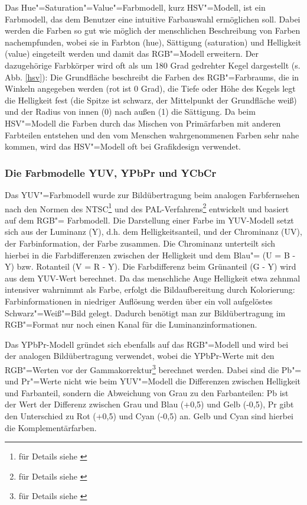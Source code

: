 \documentclass[a4paper,12pt,abstracton,titlepage]{scrartcl}
\begin{document}
Das Hue"=Saturation"=Value"=Farbmodell, kurz HSV"=Modell, ist ein Farbmodell, das dem Benutzer eine intuitive Farbauswahl ermöglichen soll. Dabei werden die Farben so gut wie möglich der  menschlichen Beschreibung von Farben nachempfunden, wobei sie in Farbton (hue), Sättigung (saturation) und Helligkeit (value) eingeteilt werden und damit das RGB"=Modell erweitern. Der dazugehörige Farbkörper wird oft als um 180 Grad gedrehter Kegel dargestellt (s. Abb. \ref{hsv}): Die Grundfläche beschreibt die Farben des RGB"=Farbraums, die in Winkeln angegeben werden (rot ist 0 Grad), die Tiefe oder Höhe des Kegels legt die Helligkeit fest (die Spitze ist schwarz, der Mittelpunkt der Grundfläche weiß) und der Radius von innen (0) nach außen (1) die Sättigung.
Da beim HSV"=Modell die Farben durch das Mischen von Primärfarben mit anderen Farbteilen entstehen und den vom Menschen wahrgenommenen Farben sehr nahe kommen, wird das HSV"=Modell oft bei Grafikdesign verwendet.

\vspace{1em}
\subsubsection{Die Farbmodelle YUV, YPbPr und YCbCr}
Das YUV"=Farbmodell wurde zur Bildübertragung beim analogen Farbfernsehen nach den Normen des NTSC\footnote{für Details siehe \cite{linkfangNTSC}} und des PAL-Verfahrens\footnote{für Details siehe \cite{linkfangPAL}} entwickelt und basiert auf dem RGB"= Farbmodell. Die Darstellung einer Farbe im YUV-Modell setzt sich aus der Luminanz (Y), d.h. dem Helligkeitsanteil, und der Chrominanz (UV), der Farbinformation, der Farbe zusammen. Die Chrominanz unterteilt sich hierbei in die Farbdifferenzen zwischen der Helligkeit und dem Blau"= (U = B - Y) bzw. Rotanteil (V = R - Y). Die Farbdifferenz beim Grünanteil (G - Y) wird aus dem YUV-Wert berechnet. Da das menschliche Auge Helligkeit etwa zehnmal intensiver wahrnimmt als Farbe, erfolgt die Bildaufbereitung durch Kolorierung: Farbinformationen in niedriger Auflösung werden über ein voll aufgelöstes Schwarz"=Weiß"=Bild gelegt. Dadurch benötigt man zur Bildübertragung im RGB"=Format nur noch einen Kanal für die Luminanzinformationen.


Das YPbPr-Modell gründet sich ebenfalls auf das RGB"=Modell und wird bei der analogen Bildübertragung verwendet, wobei die YPbPr-Werte mit den RGB"=Werten vor der Gammakorrektur\footnote{für Details siehe \cite{linkfangGamma}} berechnet werden. Dabei sind die Pb"= und Pr"=Werte nicht wie beim YUV"=Modell die Differenzen zwischen Helligkeit und Farbanteil, sondern die Abweichung von Grau zu den Farbanteilen: Pb ist der Wert der Differenz zwischen Grau und Blau (+0,5) und Gelb (-0,5), Pr gibt den Unterschied zu Rot (+0,5) und Cyan (-0,5) an. Gelb und Cyan sind hierbei die Komplementärfarben.
\end{document}
